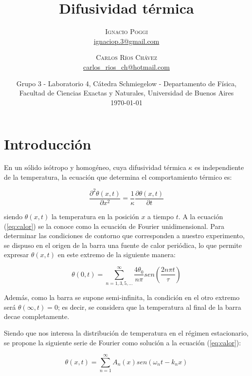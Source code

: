 \documentclass[twoside,twocolumn,a4paper]{article}
\title{Difusividad t\'ermica} %
\author{%
\textsc{Ignacio Poggi} \\[1ex] %
\normalsize \href{mailto:ignaciop.3@gmail.com}{ignaciop.3@gmail.com} %
\and %
\textsc{Carlos R\'ios Ch\'avez} \\[1ex] %
\normalsize \href{mailto:carlos_rios_ch@hotmail.com}{carlos\_rios\_ch@hotmail.com} %
}
\date{Grupo 3 - Laboratorio 4, C\'atedra Schmiegelow - Departamento de F\'isica, Facultad de Ciencias Exactas y Naturales, Universidad de Buenos Aires \newline \\ \today} %
\begin{document}
\maketitle



\section{Introducci\'on}

En un s\'olido is\'otropo y homog\'eneo, cuya difusividad t\'ermica $\kappa$ es independiente de la temperatura, la ecuaci\'on que determina el comportamiento t\'ermico es\cite{eq:calor}:

\begin{equation}
\label{eq:calor}
\frac{\partial^2 \theta (x,t)}{\partial x^{2}} = \frac{1}{\kappa} \frac{\partial \theta (x,t)}{\partial t}
\end{equation}

siendo $\theta(x,t)$ la temperatura en la posici\'on $x$ a tiempo $t$. A la ecuaci\'on (\ref{eq:calor}) se la conoce como la ecuaci\'on de Fourier unidimensional. Para determinar las condiciones de contorno que corresponden a nuestro experimento, se dispuso en el origen de la barra una fuente de calor peri\'odica, lo que permite expresar $\theta(x,t)$ en este extremo de la siguiente manera:

\begin{equation}
\label{eq:theta0}
\theta(0,t) = \sum_{n = 1, 3, 5, ...}^{\infty} \frac{4\theta_{0}}{n\pi} sen(\frac{2n\pi t}{\tau})
\end{equation}

Adem\'as, como la barra se supone semi-infinita, la condici\'on en el otro extremo ser\'a $\theta(\infty,t) = 0$; es decir, se considera que la temperatura al final de la barra decae completamente. \newline

\par
Siendo que nos interesa la distribuci\'on de temperatura en el r\'egimen estacionario, se propone la siguiente serie de Fourier como soluci\'on a la ecuaci\'on (\ref{eq:calor}):

\begin{equation}
\label{eq:solgeneral}
\theta(x,t) = \sum_{n = 1}^{\infty} A_{n}(x) sen(\omega_{n}t - k_{n}x)
\end{equation}
\end{document}
